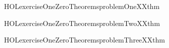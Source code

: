 \newcommand{\HOLexerciseOneZeroDate}{22 March 2020}
\newcommand{\HOLexerciseOneZeroTime}{15:45}
\begin{SaveVerbatim}{HOLexerciseOneZeroTheoremsproblemOneXXthm}
\HOLTokenTurnstile{}  
\end{SaveVerbatim}
\newcommand{\HOLexerciseOneZeroTheoremsproblemOneXXthm}{\UseVerbatim{HOLexerciseOneZeroTheoremsproblemOneXXthm}}
\begin{SaveVerbatim}{HOLexerciseOneZeroTheoremsproblemTwoXXthm}
\HOLTokenTurnstile{}  \HOLSymConst{\HOLTokenImp{}} \HOLSymConst{\HOLTokenNeg{}}
\end{SaveVerbatim}
\newcommand{\HOLexerciseOneZeroTheoremsproblemTwoXXthm}{\UseVerbatim{HOLexerciseOneZeroTheoremsproblemTwoXXthm}}
\begin{SaveVerbatim}{HOLexerciseOneZeroTheoremsproblemThreeXXthm}
\HOLTokenTurnstile{}  \HOLSymConst{\HOLTokenDisj{}} 
\end{SaveVerbatim}
\newcommand{\HOLexerciseOneZeroTheoremsproblemThreeXXthm}{\UseVerbatim{HOLexerciseOneZeroTheoremsproblemThreeXXthm}}
\newcommand{\HOLexerciseOneZeroTheorems}{
\HOLThmTag{exercise10}{problem1_thm}\HOLexerciseOneZeroTheoremsproblemOneXXthm
\HOLThmTag{exercise10}{problem2_thm}\HOLexerciseOneZeroTheoremsproblemTwoXXthm
\HOLThmTag{exercise10}{problem3_thm}\HOLexerciseOneZeroTheoremsproblemThreeXXthm
}
